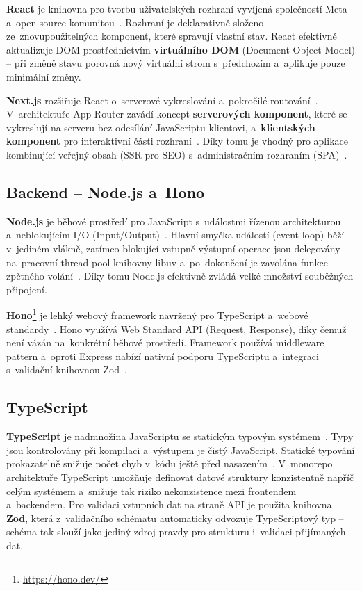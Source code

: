 \textbf{React} je knihovna pro tvorbu uživatelských rozhraní vyvíjená společností Meta a~open-source komunitou~\cite{react2024docs, elrom2021react}. Rozhraní je deklarativně složeno ze~znovupoužitelných komponent, které spravují vlastní stav. React efektivně aktualizuje DOM prostřednictvím \textbf{virtuálního DOM} (Document Object Model) -- při změně stavu porovná nový virtuální strom s~předchozím a~aplikuje pouze minimální změny.

\textbf{Next.js} rozšiřuje React o~serverové vykreslování a~pokročilé routování~\cite{nextjs2024docs}. V~architektuře App Router zavádí koncept \textbf{serverových komponent}, které se vykreslují na serveru bez odesílání JavaScriptu klientovi, a~\textbf{klientských komponent} pro interaktivní části rozhraní~\cite{pati2025nextjs}. Díky tomu je vhodný pro aplikace kombinující veřejný obsah (SSR pro SEO) s~administračním rozhraním (SPA)~\cite{thakkar2020ssr}.

\subsection{Backend -- Node.js a~Hono}

\textbf{Node.js} je běhové prostředí pro JavaScript s~událostmi řízenou architekturou a~neblokujícím I/O (Input/Output)~\cite{tilkov2010nodejs}. Hlavní smyčka událostí (event loop) běží v~jediném vlákně, zatímco blokující vstupně-výstupní operace jsou delegovány na~pracovní thread pool knihovny libuv a~po~dokončení je zavolána funkce zpětného volání~\cite{nodejs2024eventloop}. Díky tomu Node.js efektivně zvládá velké množství souběžných připojení.

\begin{sloppypar}
\textbf{Hono}\footnote{\url{https://hono.dev/}} je lehký webový framework navržený pro TypeScript a~webové standardy~\cite{hono2024docs}. Hono využívá Web Standard API (Request, Response), díky čemuž není vázán na~konkrétní běhové prostředí. Framework používá middleware pattern a~oproti Express nabízí nativní podporu TypeScriptu a~integraci s~validační knihovnou Zod~\cite{hono2024github}.
\end{sloppypar}

\subsection{TypeScript}

\textbf{TypeScript} je nadmnožina JavaScriptu se statickým typovým systémem~\cite{typescript2024docs}. Typy jsou kontrolovány při kompilaci a~výstupem je čistý JavaScript. Statické typování prokazatelně snižuje počet chyb v~kódu ještě před nasazením~\cite{gao2017typescript}. V~monorepo architektuře TypeScript umožňuje definovat datové struktury konzistentně napříč celým systémem a~snižuje tak riziko nekonzistence mezi frontendem a~backendem. Pro validaci vstupních dat na straně API je použita knihovna \textbf{Zod}, která z~validačního schématu automaticky odvozuje TypeScriptový typ -- schéma tak slouží jako jediný zdroj pravdy pro strukturu i~validaci přijímaných dat.

